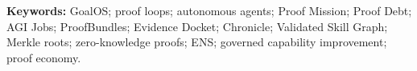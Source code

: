 \documentclass[11pt]{article}
\begin{document}
\textbf{Keywords:} GoalOS; proof loops; autonomous agents; Proof Mission; Proof Debt; AGI Jobs; ProofBundles; Evidence Docket; Chronicle; Validated Skill Graph; Merkle roots; zero-knowledge proofs; ENS; governed capability improvement; proof economy.

\tableofcontents
\clearpage











\end{document}
